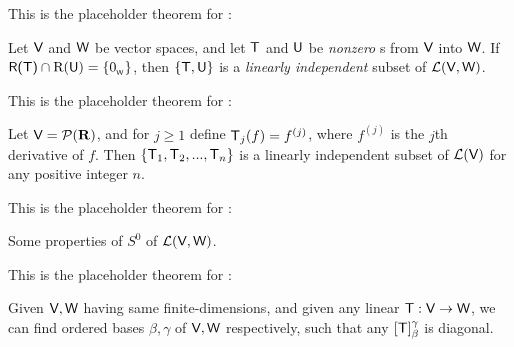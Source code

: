 \begin{additional theorem} \label{athm 2.20}
This is the placeholder theorem for :

Let \(\textsf{V}\) and \(\textsf{W}\) be vector spaces, and let \(\textsf{T}\) and \(\textsf{U}\) be \emph{nonzero} \LTRAN{}s from \(\textsf{V}\) into \(\textsf{W}\).
If \(\textsf{R(T)} \cap \mathrm{R}(\textsf{U}) = \{ 0_{_{\textsf{W}}} \}\), then
\(\{ \textsf{T}, \textsf{U} \}\) is a \emph{linearly independent} subset of \(\mathcal{L}(\textsf{V}, \textsf{W})\).
\end{additional theorem}

\begin{additional theorem} \label{athm 2.21}
This is the placeholder theorem for :

Let \(\textsf{V} = \mathcal{P}(\mathbf{R})\), and for \(j \ge 1\) define \(\textsf{T}_j(f) = f^{(j)}\), where \(f^{(j)}\) is the \(j\)th derivative of \(f\).
Then \(\{ \textsf{T}_1, \textsf{T}_2, ..., \textsf{T}_n \}\) is a
linearly independent subset of \(\mathcal{L}(\textsf{V})\) for any positive integer \(n\).
\end{additional theorem}

\begin{additional theorem} \label{athm 2.22}
This is the placeholder theorem for :

Some properties of \(S^0\) of \(\mathcal{L}(\textsf{V}, \textsf{W})\).
\end{additional theorem}

\begin{additional theorem} \label{athm 2.23}
This is the placeholder theorem for :

Given \(\textsf{V}, \textsf{W}\) having same finite-dimensions, and given any linear \(\textsf{T} : \textsf{V} \to \textsf{W}\), we can find ordered bases \(\beta, \gamma\) of \(\textsf{V}, \textsf{W}\) respectively, such that any \([\textsf{T}]_{\beta}^{\gamma}\) is diagonal. 
\end{additional theorem}